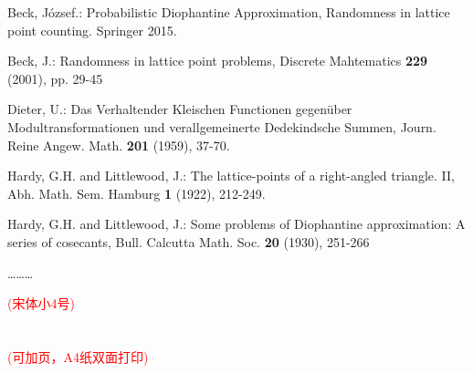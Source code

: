 \documentclass[11pt,a4paper]{article}
\newcommand{\xiaosihao}{\fontsize{12pt}{24pt}\selectfont}
\newcommand{\wuhao}{\fontsize{10.5pt}{18pt}\selectfont}
\newcommand\seccontent{
	\xiaosihao %
    \setlength{\parindent}{2em} %
    \setlength{\parskip}{0pt}
   }
\theoremstyle{definition}
\numberwithin{equation}{section}
\begin{document}
{}

\begin{thebibliography}{2}
	\seccontent
	Beck, J\'ozsef.: Probabilistic Diophantine Approximation, Randomness in lattice point counting. Springer 2015.

	Beck, J.: Randomness in lattice point problems, Discrete Mahtematics \textbf{229} (2001), pp. 29-45

	Dieter, U.: Das Verhaltender Kleischen Functionen gegen\"uber Modultransformationen und verallgemeinerte Dedekindsche Summen, Journ. Reine Angew. Math. \textbf{201} (1959), 37-70.

	Hardy, G.H. and Littlewood, J.: The lattice-points of a right-angled triangle. II, Abh. Math. Sem. Hamburg \textbf{1} (1922), 212-249.

	Hardy, G.H. and Littlewood, J.: Some problems of Diophantine approximation: A series of cosecants, Bull. Calcutta Math. Soc. \textbf{20} (1930), 251-266

\end{thebibliography}
%	

\hspace{15em} \ldots\ldots\ldots

{\wuhao\textcolor{red}{(宋体小4号)}}
\\
\\
\\
{\wuhao\textcolor{red}{(可加页，A4纸双面打印)}}
\end{document}
